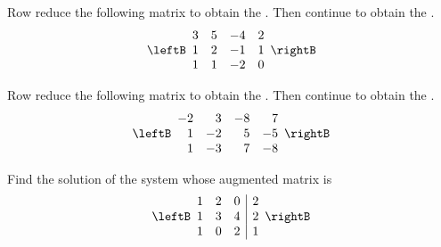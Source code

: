 \begin{enumialphparenastyle}
\begin{ex} Row reduce the following matrix to obtain the \ef. Then continue to obtain the \rref. 
\begin{equation*}
\leftB
\begin{array}{rrrr}
3 & 5 & -4 & 2 \\
1 & 2 & -1 & 1 \\
1 & 1 & -2 & 0
\end{array}
\rightB
\end{equation*}
\end{ex}

\begin{ex} Row reduce the following matrix to obtain the \ef. Then continue to obtain the \rref. 
\begin{equation*}
\leftB
\begin{array}{rrrr}
-2 & 3 & -8 & 7 \\
1 & -2 & 5 & -5 \\
1 & -3 & 7 & -8
\end{array}
\rightB
\end{equation*}
\end{ex}
 
\begin{ex} Find the solution of the system whose augmented matrix is 
\begin{equation*}
\leftB
\begin{array}{rrr|r}
1 & 2 & 0 & 2 \\
1 & 3 & 4 & 2 \\
1 & 0 & 2 & 1
\end{array}
\rightB 
\end{equation*}
\end{ex}


\end{enumialphparenastyle}
